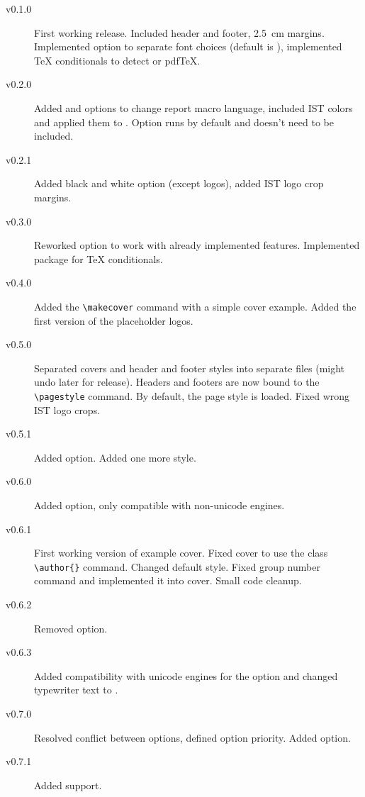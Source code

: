 \documentclass[palatino,english]{ist-report}
\begin{document}
\begin{description}
	\item [v0.1.0] First working release. Included header and footer, \SI{2.5}{\centi\meter} margins. Implemented  option to separate font choices (default is ), implemented \TeX{} conditionals to detect \XeTeX{} or pdf\TeX{}.
	\item [v0.2.0] Added  and  options to change report macro language, included IST colors and applied them to . Option  runs by default and doesn't need to be included.
	\item [v0.2.1] Added black and white option (except logos), added IST logo crop margins.
	\item [v0.3.0] Reworked  option to work with already implemented features. Implemented  package for \TeX{} conditionals.
	\item [v0.4.0] Added the \verb|\makecover| command with a simple cover example. Added the first version of the placeholder logos.
	\item [v0.5.0] Separated covers and header and footer styles into separate files (might undo later for release). Headers and footers are now bound to the \verb|\pagestyle| command. By default, the  page style is loaded. Fixed wrong IST logo crops.
	\item [v0.5.1] Added  option. Added one more style.
	\item [v0.6.0] Added  option, only compatible with non-unicode engines.
	\item [v0.6.1] First working version of example cover. Fixed cover to use the  class \verb|\author{}| command. Changed default style. Fixed group number command and implemented it into cover. Small code cleanup.
	\item [v0.6.2] Removed  option.
	\item [v0.6.3] Added compatibility with unicode engines for the  option and changed typewriter text to .
	\item [v0.7.0] Resolved conflict between options, defined option priority. Added  option.
	\item [v0.7.1] Added \LuaLaTeX{} support.
\end{description}

\printbibliography
\end{document}
